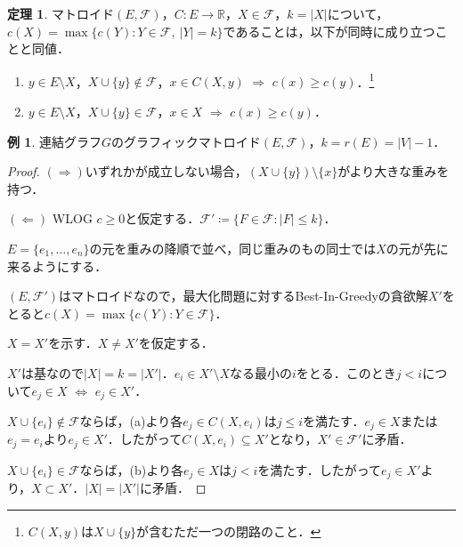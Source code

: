 \documentclass[xelatex,ja=standard,a4paper,14pt,everyparhook=compat]{bxjsarticle}
\newcommand{\bbR}{\mathbb{R}}
\newcommand{\mcF}{\mathcal{F}}
\theoremstyle{definition}
\newtheorem{theorem}{定理}[section]
\newtheorem*{example*}{例}
\begin{document}
\begin{theorem}
    マトロイド$(E,\mcF)$，$C: E \to \bbR$，$X \in \mcF$，$k = |X|$について，$c(X) = \max\{c(Y) : Y \in \mcF,\ |Y| = k\}$であることは，以下が同時に成り立つことと同値． \begin{enumerate}
        \item $y \in E \setminus X$，$X \cup \{y\} \notin \mcF$，$x \in C(X,y)$ $\Longrightarrow$ $c(x) \geq c(y)$．\footnote{$C(X,y)$は$X\cup\{y\}$が含むただ一つの閉路のこと．}
        \item $y \in E \setminus X$，$X \cup \{y\} \in \mcF$，$x \in X$ $\Longrightarrow$ $c(x) \geq c(y)$．
    \end{enumerate}
\end{theorem}

\begin{example*}
    連結グラフ$G$のグラフィックマトロイド$(E,\mcF)$，$k=r(E)=|V|-1$．
\end{example*}

\begin{proof}
    $(\Longrightarrow)$いずれかが成立しない場合，$(X \cup \{y\}) \setminus \{x\}$がより大きな重みを持つ．

    $(\Longleftarrow)$ WLOG $c \geq 0$と仮定する．$\mcF' \coloneqq \{F \in \mcF : |F| \leq k\}$．

    $E = \{e_1,\ldots,e_n\}$の元を重みの降順で並べ，同じ重みのもの同士では$X$の元が先に来るようにする．

    $(E,\mcF')$はマトロイドなので，最大化問題に対するBest-In-Greedyの貪欲解$X'$をとると$c(X) = \max\{c(Y) : Y \in \mcF\}$．

    $X = X'$を示す．$X \neq X'$を仮定する．

    $X'$は基なので$|X| = k = |X'|$．$e_i \in X' \setminus X$なる最小の$i$をとる．このとき$j < i$について$e_j \in X$ $\Longleftrightarrow$ $e_j \in X'$．

    $X \cup \{e_i\} \notin \mcF$ならば，(a)より各$e_j \in C(X,e_i)$は$j \leq i$を満たす．$e_j \in X$または$e_j = e_i$より$e_j \in X'$．したがって$C(X,e_i) \subseteq X'$となり，$X' \in \mcF'$に矛盾．

    $X \cup \{e_i\} \in \mcF$ならば，(b)より各$e_j \in X$は$j < i$を満たす．したがって$e_j \in X'$より，$X \subset X'$．$|X| = |X'|$に矛盾．
\end{proof}
\end{document}
